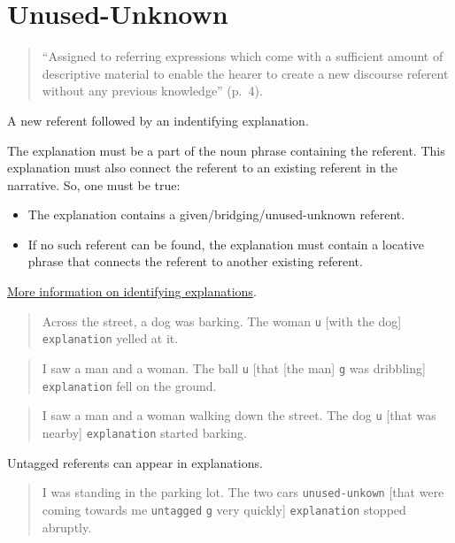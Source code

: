 \documentclass[
]{book}
\providecommand{\tightlist}{%
  \setlength{\itemsep}{0pt}\setlength{\parskip}{0pt}}
\begin{document}
\hypertarget{unused-unknown}{%
\section{Unused-Unknown}\label{unused-unknown}}

\begin{quote}
``Assigned to referring expressions which come with a sufficient amount of descriptive material to enable the hearer to create a new discourse referent without any previous knowledge'' (p.~4).
\end{quote}

A new referent followed by an indentifying explanation.

The explanation must be a part of the noun phrase containing the referent.
This explanation must also connect the referent to an existing referent in the narrative.
So, one must be true:

\begin{itemize}
\tightlist
\item
  The explanation contains a given/bridging/unused-unknown referent.
\item
  If no such referent can be found,
  the explanation must contain a locative phrase
  that connects the referent to another existing referent.
\end{itemize}

\protect\hyperlink{referent-explanations}{More information on identifying explanations}.

\begin{quote}
Across the street, a dog was barking.
The woman \texttt{u} {[}with the dog{]} \texttt{explanation} yelled at it.
\end{quote}

\begin{quote}
I saw a man and a woman.
The ball \texttt{u} {[}that {[}the man{]} \texttt{g} was dribbling{]} \texttt{explanation} fell on the ground.
\end{quote}

\begin{quote}
I saw a man and a woman walking down the street.
The dog \texttt{u} {[}that was nearby{]} \texttt{explanation} started barking.
\end{quote}

Untagged referents can appear in explanations.

\begin{quote}
I was standing in the parking lot.
The two cars \texttt{unused-unkown} {[}that were coming towards me \texttt{untagged} \texttt{g} very quickly{]} \texttt{explanation} stopped abruptly.
\end{quote}
\end{document}
